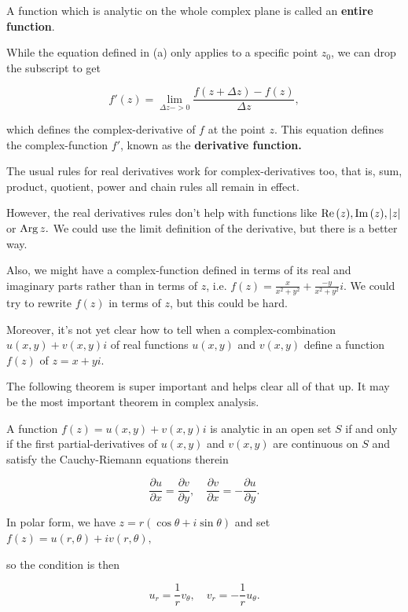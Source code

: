 \documentclass{article}
\begin{document}
\begin{definition}[Entire]
A function which is \@{analytic} on the whole complex plane is called an \textbf{entire function}.
\end{definition}

\begin{definition}
While the equation defined in (a) only applies to a specific point $z_0$, we can drop the subscript to get

\[ f'(z) = \lim_{\Delta z -> 0} \frac{f(z + \Delta z) - f(z)}{\Delta z}, \tag{b} \]

which defines the \@{complex-derivative} of $f$ at the \@{point} $z$. This equation defines the \@{complex-function} $f'$, known as the \textbf{derivative function.}
\end{definition}

The usual rules for real derivatives work for \@{complex-derivatives} too, that is, sum, product, quotient, power and chain rules all remain in effect.

However, the real derivatives rules don't help with functions like $\operatorname{Re}{(z)}, \operatorname{Im}{(z)}, \left| z \right|$ or $\operatorname{Arg}{z}.$ We could use the limit definition of the derivative, but there is a better way.

Also, we might have a \@{complex-function} defined in terms of its real and imaginary parts rather than in terms of $z$, i.e. $f(z) = \frac{x}{x^2 + y^2} + \frac{-y}{x^2 + y^2}i$. We could try to rewrite $f(z)$ in terms of $z$, but this could be hard.

Moreover, it's not yet clear how to tell when a \@{complex-combination} $u(x,y) + v(x,y)i$ of \@{real} \@{functions} $u(x,y)$ and $v(x,y)$ define a \@{function} $f(z)$ of $z = x + yi$.

The following theorem is super important and helps clear all of that up. It may be the most important theorem in complex analysis.

\begin{theorem}\label{cauchy-riemann-equations}
A function $f(z) = u(x,y) + v(x,y)i$ is \@{analytic} in an \@{open} \@{set} $S$ if and only if the first \@{partial-derivatives} of $u(x,y)$ and $v(x,y)$ are \@{continuous} on $S$ and satisfy the Cauchy-Riemann equations therein

\[ \frac{\partial u}{\partial x} = \frac{\partial v}{\partial y}, \quad \frac{\partial v}{\partial x} = - \frac{\partial u}{\partial y}. \tag{c} \]

In polar form, we have $z = r(\cos{\theta} + i \sin{\theta})$ and set $f(z) = u(r, \theta) + i v(r, \theta),$

so the condition is then

\[ u_r = \frac{1}{r} v_{\theta}, \quad v_r =  - \frac{1}{r} u_{\theta}. \]
\end{theorem}
\end{document}
